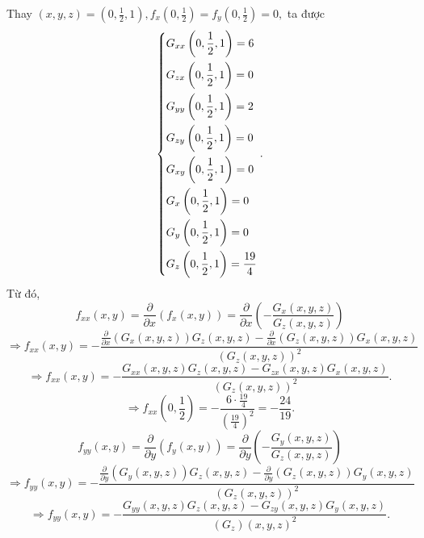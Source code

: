 \documentclass[12pt,a4paper]{article}
\begin{document}
Thay \(\left( {x,y,z} \right) = \left( {0,\frac{1}{2},1} \right),{f_x}\left( {0,\frac{1}{2}} \right) = {f_y}\left( {0,\frac{1}{2}} \right) = 0,\) ta được
\[\left\{ \begin{gathered}
  {G_{xx}}\left( {0,\frac{1}{2},1} \right) = 6 \hfill \\
  {G_{zx}}\left( {0,\frac{1}{2},1} \right) = 0 \hfill \\
  {G_{yy}}\left( {0,\frac{1}{2},1} \right) = 2 \hfill \\
  {G_{zy}}\left( {0,\frac{1}{2},1} \right) = 0 \hfill \\
  {G_{xy}}\left( {0,\frac{1}{2},1} \right) = 0 \hfill \\
  {G_x}\left( {0,\frac{1}{2},1} \right) = 0 \hfill \\
  {G_y}\left( {0,\frac{1}{2},1} \right) = 0 \hfill \\
  {G_z}\left( {0,\frac{1}{2},1} \right) = \frac{{19}}{4} \hfill \\ 
\end{gathered}  \right..\]
Từ đó,
\[{f_{xx}}\left( {x,y} \right) = \frac{\partial }{{\partial x}}\left( {{f_x}\left( {x,y} \right)} \right) = \frac{\partial }{{\partial x}}\left( { - \frac{{{G_x}\left( {x,y,z} \right)}}{{{G_z}\left( {x,y,z} \right)}}} \right)\]
\[ \Rightarrow {f_{xx}}\left( {x,y} \right) =  - \frac{{\frac{\partial }{{\partial x}}\left( {{G_x}\left( {x,y,z} \right)} \right){G_z}\left( {x,y,z} \right) - \frac{\partial }{{\partial x}}\left( {{G_z}\left( {x,y,z} \right)} \right){G_x}\left( {x,y,z} \right)}}{{{{\left( {{G_z}\left( {x,y,z} \right)} \right)}^2}}}\]
\[ \Rightarrow {f_{xx}}\left( {x,y} \right) =  - \frac{{{G_{xx}}\left( {x,y,z} \right){G_z}\left( {x,y,z} \right) - {G_{zx}}\left( {x,y,z} \right){G_x}\left( {x,y,z} \right)}}{{{{\left( {{G_z}\left( {x,y,z} \right)} \right)}^2}}}.\]
\[ \Rightarrow {f_{xx}}\left( {0,\frac{1}{2}} \right) =  - \frac{{6 \cdot \frac{{19}}{4}}}{{{{\left( {\frac{{19}}{4}} \right)}^2}}} =  - \frac{{24}}{{19}}.\]
\[{f_{yy}}\left( {x,y} \right) = \frac{\partial }{{\partial y}}\left( {{f_y}\left( {x,y} \right)} \right) = \frac{\partial }{{\partial y}}\left( { - \frac{{{G_y}\left( {x,y,z} \right)}}{{{G_z}\left( {x,y,z} \right)}}} \right)\]
\[ \Rightarrow {f_{yy}}\left( {x,y} \right) =  - \frac{{\frac{\partial }{{\partial y}}\left( {{G_y}\left( {x,y,z} \right)} \right){G_z}\left( {x,y,z} \right) - \frac{\partial }{{\partial y}}\left( {{G_z}\left( {x,y,z} \right)} \right){G_y}\left( {x,y,z} \right)}}{{{{\left( {{G_z}\left( {x,y,z} \right)} \right)}^2}}}\]
\[ \Rightarrow {f_{yy}}\left( {x,y} \right) =  - \frac{{{G_{yy}}\left( {x,y,z} \right){G_z}\left( {x,y,z} \right) - {G_{zy}}\left( {x,y,z} \right){G_y}\left( {x,y,z} \right)}}{{\left( {{G_z}} \right){{\left( {x,y,z} \right)}^2}}}.\]
\end{document}
